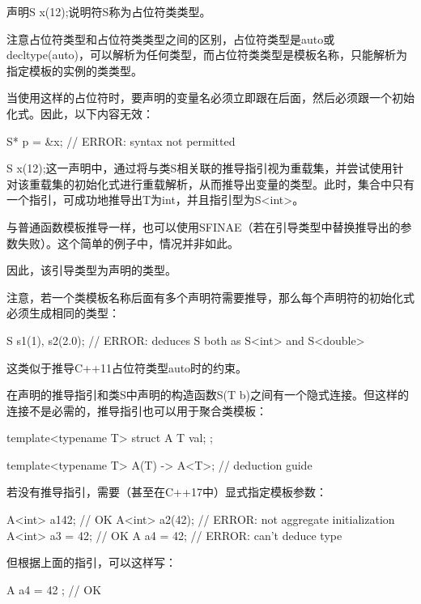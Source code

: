 声明S x(12);说明符S称为占位符类类型。

\begin{notice}
注意占位符类型和占位符类类型之间的区别，占位符类型是auto或decltype(auto)，可以解析为任何类型，而占位符类类型是模板名称，只能解析为指定模板的实例的类类型。
\end{notice}

当使用这样的占位符时，要声明的变量名必须立即跟在后面，然后必须跟一个初始化式。因此，以下内容无效：
	
\begin{cpp}
S* p = &x; // ERROR: syntax not permitted
\end{cpp}

S x(12);这一声明中，通过将与类S相关联的推导指引视为重载集，并尝试使用针对该重载集的初始化式进行重载解析，从而推导出变量的类型。此时，集合中只有一个指引，可成功地推导出T为int，并且指引型为S<int>。

\begin{notice}
与普通函数模板推导一样，也可以使用SFINAE（若在引导类型中替换推导出的参数失败）。这个简单的例子中，情况并非如此。
\end{notice}

因此，该引导类型为声明的类型。

注意，若一个类模板名称后面有多个声明符需要推导，那么每个声明符的初始化式必须生成相同的类型：

\begin{cpp}
S s1(1), s2(2.0); // ERROR: deduces S both as S<int> and S<double>
\end{cpp}

这类似于推导C++11占位符类型auto时的约束。

在声明的推导指引和类S中声明的构造函数S(T b)之间有一个隐式连接。但这样的连接不是必需的，推导指引也可以用于聚合类模板：

\begin{cpp}
template<typename T>
struct A
{
	T val;
};

template<typename T> A(T) -> A<T>; // deduction guide
\end{cpp}

若没有推导指引，需要（甚至在C++17中）显式指定模板参数：

\begin{cpp}
A<int> a1{42}; // OK
A<int> a2(42); // ERROR: not aggregate initialization
A<int> a3 = {42}; // OK
A a4 = 42; // ERROR: can't deduce type
\end{cpp}

但根据上面的指引，可以这样写：

\begin{cpp}
A a4 = { 42 }; // OK
\end{cpp}

